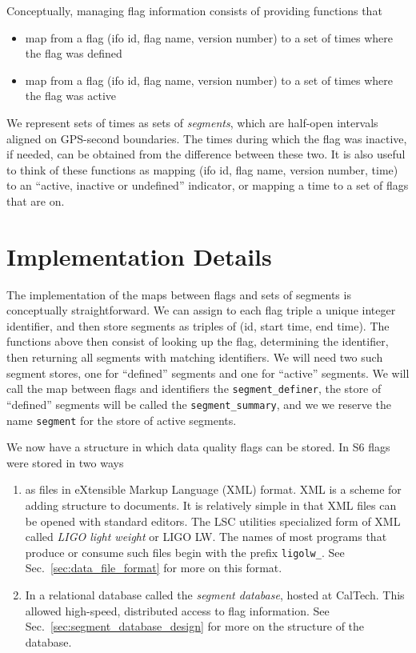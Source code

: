Conceptually, managing flag information consists of providing
functions that
%
\begin{itemize}
\item map from a flag (ifo id, flag name, version number) to a set of
times where the flag was defined
\item map from a flag (ifo id, flag name, version number) to a set of
times where the flag was active
\end{itemize}
%
We represent sets of times as sets of \emph{segments}, which are
half-open intervals aligned on GPS-second boundaries.  The times
during which the flag was inactive, if needed, can be obtained from the
difference between these two.  It is also useful to think of these
functions as mapping (ifo id, flag name, version number, time) to an
``active, inactive or undefined'' indicator, or mapping a time to a
set of flags that are on.






\section{Implementation Details}

The implementation of the maps between flags and sets of segments is
conceptually straightforward.  We can assign to each flag triple a
unique integer identifier, and then store segments as triples of (id, start
time, end time).  The functions above then consist of looking up the
flag, determining the identifier, then returning all segments with
matching identifiers.  We will need two such segment stores, one for
``defined'' segments and one for ``active'' segments.  We will call the
map between flags and identifiers the \texttt{segment\_definer}, the
store of ``defined'' segments will be called the
\texttt{segment\_summary}, and we we reserve the name \texttt{segment}
for the store of active segments.

We now have a structure in which data quality flags can be stored.
In S6 flags were stored in two ways
%
\begin{enumerate}
\item as files in eXtensible Markup Language (XML) format.  XML is a
scheme for adding structure to documents.  It is relatively
simple in that XML files can be opened with standard editors.  The LSC
utilities specialized form of XML called \emph{LIGO light weight} or
LIGO LW.  The names of most programs that produce or consume such files
begin with the prefix \texttt{ligolw\_}.  See
Sec.~\ref{sec:data_file_format} for more on this format.

\item In a relational database called the \emph{segment database},
hosted at CalTech.  This allowed high-speed, distributed
access to flag information.  See
Sec.~\ref{sec:segment_database_design} for more on the structure of
the database.
\end{enumerate}


